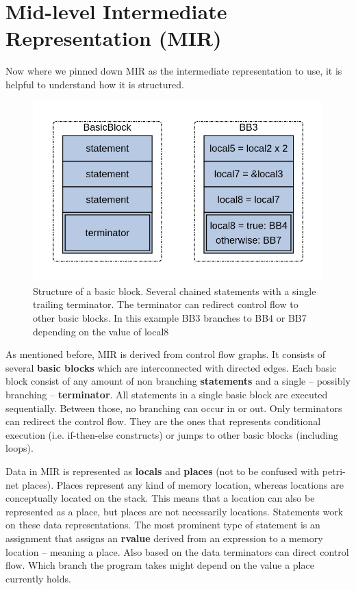 \section{Mid-level Intermediate Representation (MIR)}
\label{app_mir}

Now where we pinned down MIR as the intermediate representation to use, it is helpful to understand how it is structured.

\begin{figure}
    \centering
    \includegraphics[width=.7\textwidth]{../diagrams/BasicBlock.png}
    \caption{
        Structure of a basic block. 
        Several chained statements with a single trailing terminator.
        The terminator can redirect control flow to other basic blocks.
        In this example BB3 branches to BB4 or BB7 depending on the value of local8
        }
    \label{mir_bb}
\end{figure}

As mentioned before, MIR is derived from control flow graphs\cite[chapter 2.17]{rustc-guide}.
It consists of several \textbf{basic blocks} which are interconnected with directed edges.
Each basic block consist of any amount of non branching \textbf{statements} and a single -- possibly branching -- \textbf{terminator}.
All statements in a single basic block are executed sequentially.
Between those, no branching can occur in or out.
Only terminators can redirect the control flow.
They are the ones that represents conditional execution (i.e. if-then-else constructs) or jumps to other basic blocks (including loops).

Data in MIR is represented as \textbf{locals} and \textbf{places} (not to be confused with petri-net places).
Places represent any kind of memory location, whereas locations are conceptually located on the stack.
This means that a location can also be represented as a place, but places are not necessarily locations.
Statements work on these data representations.
The most prominent type of statement is an assignment that assigns an \textbf{rvalue} derived from an expression to a memory location -- meaning a place.
Also based on the data terminators can direct control flow.
Which branch the program takes might depend on the value a place currently holds.

